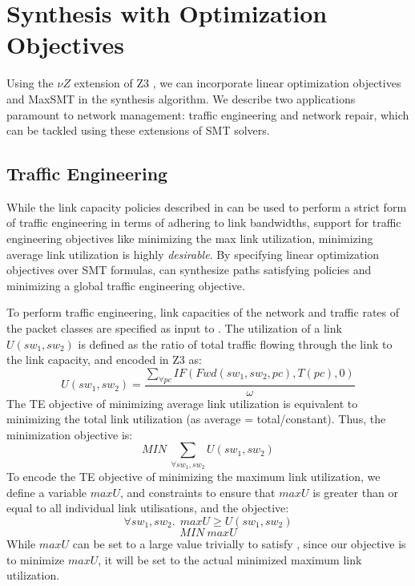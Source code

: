 \section{Synthesis with Optimization Objectives}
Using the $\nu Z$ extension of Z3 \cite{nuz3}, we can incorporate 
linear optimization
objectives and MaxSMT in the synthesis algorithm. 
We describe two applications paramount to network management:
traffic engineering and network repair, which can be tackled using
these extensions of SMT solvers.
\subsection{Traffic Engineering}
While the link capacity policies described in  can
be used to perform a strict form of traffic engineering in terms of 
adhering to link bandwidths, support for traffic engineering objectives
like minimizing the max link utilization, minimizing average link utilization
is highly \emph{desirable}. By specifying linear optimization objectives over
SMT formulas, \name can synthesize paths satisfying policies and minimizing
a global traffic engineering objective. 

To perform traffic engineering, link capacities of the network and traffic 
rates of the packet classes are specified as input to \name. The utilization 
of a link $U(sw_1, sw_2)$ is defined as the ratio of total traffic flowing through the link to the 
link capacity, and encoded in Z3 as:
\begin{equation}
U(sw_1, sw_2) = \frac{\sum_{\forall pc} IF(Fwd(sw_1,sw_2, pc), T(pc), 0)} {\omega}
\end{equation}
The TE objective of minimizing average link utilization is equivalent to minimizing
the total link utilization (as average = total/constant). Thus, the minimization
objective is:
\begin{equation}
	MIN\ \sum_{\forall sw_1, sw_2} U(sw_1, sw_2)
\end{equation}
To encode the TE objective of minimizing the maximum link utilization, we define
a variable $maxU$, and constraints to ensure that $maxU$ is greater than or equal to all 
individual link utilisations, and the objective: 
\begin{equation} \label{eq:maxu}
\forall sw_1, sw_2.\ \ maxU \geq U(sw_1, sw_2)
\end{equation} 
\begin{equation}
	MIN\ maxU
\end{equation}
While $maxU$ can be set to a large value trivially to satisfy 
, since our objective is to minimize $maxU$, it will be set to the actual
minimized maximum link utilization. 

